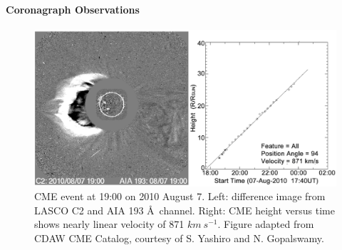 \paragraph{Coronagraph Observations}

\begin{figure}[!h]
    \begin{center}
	    \includegraphics[width=150mm]{Images/Lasco2010Aug7Cme.png}
    \end{center}
    \caption[LASCO coronagraph data for 2010 August 7 event]{
        CME event at 19:00 on 2010 August 7. Left: difference image from LASCO C2 and AIA 193 \AA\ channel. 
        Right: CME height versus time shows nearly linear velocity of 871 $km\ s^{-1}$. 
        Figure adapted from CDAW CME Catalog, courtesy of S. Yashiro and N. Gopalswamy.
	}
    \label{lasco2010aug7}
\end{figure}

